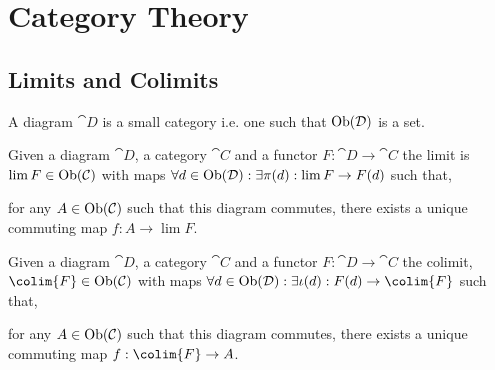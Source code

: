 \documentclass[12pt]{extarticle}
\begin{document}
\section{Category Theory}

\subsection{Limits and Colimits}
\begin{definition}
A diagram $\cat{D}$ is a small category i.e. one such that $\mathrm{Ob}(\mathcal{D})$ is a set. 
\end{definition}
\begin{definition}
Given a diagram $\cat{D}$, a category $\cat{C}$ and a functor $F : \cat{D} \to \cat{C}$ the limit is $\lim{F} \in \mathrm{Ob}(\mathcal{C})$ with maps $\forall d \in \mathrm{Ob}(\mathcal{D}) : \exists \pi(d) : \lim{F} \to F(d)$ such that,
\begin{center}
\end{center}
for any $A \in \mathrm{Ob}(\mathcal{C})$ such that this diagram commutes, there exists a unique commuting map $f : A \to \lim{F}$. 
\end{definition}

\begin{definition}
Given a diagram $\cat{D}$, a category $\cat{C}$ and a functor $F : \cat{D} \to \cat{C}$ the colimit, $\colim{F} \in \Ob{\cat{C}}$ with maps $\forall d \in \Ob{\cat{D}} : \exists \iota(d) : F(d) \to \colim{F}$ such that,
\begin{center}
\end{center}
for any $A \in \mathrm{Ob}(\mathcal{C})$ such that this diagram commutes, there exists a unique commuting map $f : \colim{F} \to A$. 
\end{definition}
\end{document}
